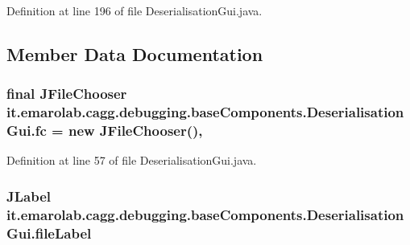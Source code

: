 Definition at line 196 of file Deserialisation\-Gui.\-java.



\subsection{Member Data Documentation}
\hypertarget{classit_1_1emarolab_1_1cagg_1_1debugging_1_1baseComponents_1_1DeserialisationGui_aa9297271a9827471ff85e57941f50f45}{
\subsubsection[{fc}]{\setlength{\rightskip}{0pt plus 5cm}final J\-File\-Chooser it.\-emarolab.\-cagg.\-debugging.\-base\-Components.\-Deserialisation\-Gui.\-fc = new J\-File\-Chooser()\hspace{0.3cm}{\ttfamily [static]}, {\ttfamily [private]}}}\label{classit_1_1emarolab_1_1cagg_1_1debugging_1_1baseComponents_1_1DeserialisationGui_aa9297271a9827471ff85e57941f50f45}


Definition at line 57 of file Deserialisation\-Gui.\-java.

\hypertarget{classit_1_1emarolab_1_1cagg_1_1debugging_1_1baseComponents_1_1DeserialisationGui_a9e3d72e436cb5b9e4fdf667c7aeaf84d}{
\subsubsection[{file\-Label}]{\setlength{\rightskip}{0pt plus 5cm}J\-Label it.\-emarolab.\-cagg.\-debugging.\-base\-Components.\-Deserialisation\-Gui.\-file\-Label\hspace{0.3cm}{\ttfamily [private]}}}\label{classit_1_1emarolab_1_1cagg_1_1debugging_1_1baseComponents_1_1DeserialisationGui_a9e3d72e436cb5b9e4fdf667c7aeaf84d}



